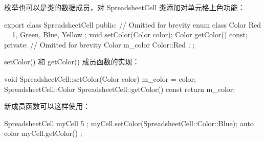 枚举也可以是类的数据成员，对 SpreadsheetCell 类添加对单元格上色功能：

\begin{cpp}
export class SpreadsheetCell
{
    public:
        // Omitted for brevity
        enum class Color { Red = 1, Green, Blue, Yellow };
        void setColor(Color color);
        Color getColor() const;
    private:
        // Omitted for brevity
        Color m_color { Color::Red };
};
\end{cpp}

setColor() 和 getColor() 成员函数的实现：

\begin{cpp}
void SpreadsheetCell::setColor(Color color) { m_color = color; }
SpreadsheetCell::Color SpreadsheetCell::getColor() const { return m_color; }
\end{cpp}

新成员函数可以这样使用：

\begin{cpp}
SpreadsheetCell myCell { 5 };
myCell.setColor(SpreadsheetCell::Color::Blue);
auto color { myCell.getColor() };
\end{cpp}






















